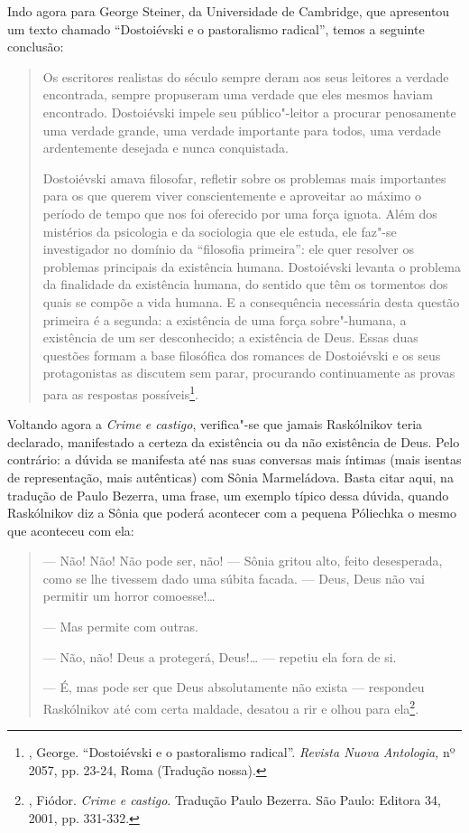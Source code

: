 Indo agora para George Steiner, da Universidade de Cambridge, que
apresentou um texto chamado ``Dostoiévski e o pastoralismo radical'',
temos a seguinte conclusão:

\begin{quote}
Os escritores realistas do século  sempre deram aos seus leitores a
verdade encontrada, sempre propuseram uma verdade que eles mesmos haviam
encontrado. Dostoiévski impele seu público"-leitor a procurar penosamente
uma verdade grande, uma verdade importante para todos, uma verdade
ardentemente desejada e nunca conquistada.

Dostoiévski amava filosofar, refletir sobre os problemas mais
importantes para os que querem viver conscientemente e aproveitar ao
máximo o período de tempo que nos foi oferecido por uma força ignota.
Além dos mistérios da psicologia e da sociologia que ele estuda, ele
faz"-se investigador no domínio da ``filosofia primeira'': ele quer
resolver os problemas principais da existência humana. Dostoiévski
levanta o problema da finalidade da existência humana, do sentido que
têm os tormentos dos quais se compõe a vida humana. E a consequência
necessária desta questão primeira é a segunda: a existência de uma força
sobre"-humana, a existência de um ser desconhecido; a existência de Deus.
Essas duas questões formam a base filosófica dos romances de Dostoiévski
e os seus protagonistas as discutem sem parar, procurando continuamente
as provas para as respostas possíveis\footnote{, George.
  ``Dostoiévski e o pastoralismo radical''. \emph{Revista Nuova Antologia,}
  nº 2057, pp. 23-24, Roma (Tradução nossa).}.
\end{quote}

Voltando agora a \emph{Crime e castigo}, verifica"-se que jamais
Raskólnikov teria declarado, manifestado a certeza da existência ou da
não existência de Deus. Pelo contrário: a dúvida se manifesta até nas
suas conversas mais íntimas (mais isentas de representação, mais
autênticas) com Sônia Marmeládova. Basta citar aqui, na tradução de
Paulo Bezerra, uma frase, um exemplo típico dessa dúvida, quando
Raskólnikov diz a Sônia que poderá acontecer com a pequena Póliechka o
mesmo que aconteceu com ela:

\begin{quote}
--- Não! Não! Não pode ser, não! --- Sônia gritou alto, feito desesperada,
como se lhe tivessem dado uma súbita facada. --- Deus, Deus não vai
permitir um horror comoesse!\ldots{}

--- Mas permite com outras.

--- Não, não! Deus a protegerá, Deus!\ldots{} --- repetiu ela fora de si.

--- É, mas pode ser que Deus absolutamente não exista --- respondeu
Raskólnikov até com certa maldade, desatou a rir e olhou para
ela\footnote{, Fiódor. \emph{Crime e castigo}. Tradução
  Paulo Bezerra. São Paulo: Editora 34, 2001, pp. 331-332.}.
\end{quote}

